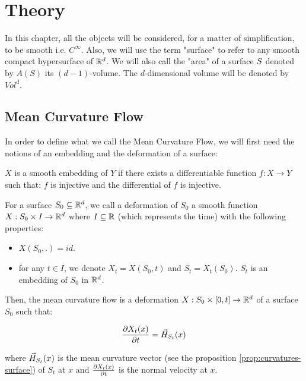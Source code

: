 \chapter{Theory}
\label{chapter:theory}

In this chapter, all the objects will be considered, for a matter of
simplification, to be smooth i.e. $ C^\infty $. Also, we will use the term
"surface" to refer to any smooth compact hypersurface of $ \mathbb{R}^d $. We will also
call the "area" of a surface $ S $ denoted by $ A(S) $ its $ (d-1)
$-volume. The $d$-dimensional volume will be denoted by $ Vol^d $.

\section{Mean Curvature Flow}

In order to define what we call the Mean Curvature Flow, we will
first need the notions of an embedding and the deformation of a surface:

\begin{definition}
    $ X $ is a smooth embedding of $ Y $ if there exists a differentiable
    function $ f : X \to Y $ such that: $ f $ is injective and the differential
    of $ f $ is injective.
\end{definition}

\begin{definition}
    For a surface $ S_0 \subseteq \mathbb{R}^d $, we call a deformation of $ S_0 $ a
    smooth function $ X : S_0 \times I \to \mathbb{R}^d $ where $ I \subseteq \mathbb{R} $
    (which represents the time) with the following properties:
    \begin{itemize}
        \item $ X(S_0, .) = id $.
        \item for any $ t \in I $, we denote $ X_t = X(S_0, t) $ and $ S_t =
            X_t(S_0) $. $ S_t $ is an embedding of $ S_0 $ in $ \mathbb{R}^d $.
    \end{itemize}
\end{definition}

Then, the mean curvature flow is a deformation $ X : S_0 \times [0, t] \to \mathbb{R}^d
$ of a surface $ S_0 $ such that:

\begin{equation}
    \frac{\partial{X_t(x)}}{\partial{t}} = \vec{H}_{S_t}(x)
\end{equation}

where $ \vec{H}_{S_t}(x) $ is the mean curvature vector (see the proposition
\ref{prop:curvatures-surface}) of $ S_t $ at $ x $ and $ \frac{\partial{X_t(x)}}{\partial{t}} $
is the normal velocity at $ x $.

